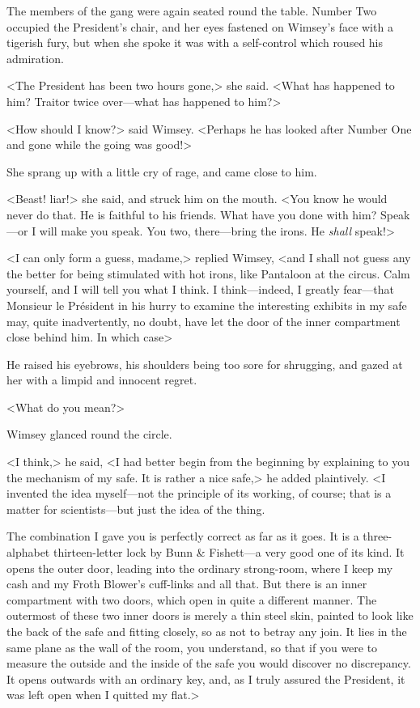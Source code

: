 The members of the gang were again seated round the table. Number Two occupied the President's chair, and her eyes fastened on Wimsey's face with a tigerish fury, but when she spoke it was with a self-control which roused his admiration.

<The President has been two hours gone,> she said. <What has happened to him? Traitor twice over—what has happened to him?>

<How should I know?> said Wimsey. <Perhaps he has looked after Number One and gone while the going was good!>

She sprang up with a little cry of rage, and came close to him.

<Beast! liar!> she said, and struck him on the mouth. <You know he would never do that. He is faithful to his friends. What have you done with him? Speak—or I will make you speak. You two, there—bring the irons. He \textit{shall} speak!>

<I can only form a guess, madame,> replied Wimsey, <and I shall not guess any the better for being stimulated with hot irons, like Pantaloon at the circus. Calm yourself, and I will tell you what I think. I think—indeed, I greatly fear—that Monsieur le Président in his hurry to examine the interesting exhibits in my safe may, quite inadvertently, no doubt, have let the door of the inner compartment close behind him. In which case\longdash>

He raised his eyebrows, his shoulders being too sore for shrugging, and gazed at her with a limpid and innocent regret.

<What do you mean?>

Wimsey glanced round the circle.

<I think,> he said, <I had better begin from the beginning by explaining to you the mechanism of my safe. It is rather a nice safe,> he added plaintively. <I invented the idea myself—not the principle of its working, of course; that is a matter for scientists—but just the idea of the thing.

The combination I gave you is perfectly correct as far as it goes. It is a three-alphabet thirteen-letter lock by Bunn \& Fishett—a very good one of its kind. It opens the outer door, leading into the ordinary strong-room, where I keep my cash and my Froth Blower's cuff-links and all that. But there is an inner compartment with two doors, which open in quite a different manner. The outermost of these two inner doors is merely a thin steel skin, painted to look like the back of the safe and fitting closely, so as not to betray any join. It lies in the same plane as the wall of the room, you understand, so that if you were to measure the outside and the inside of the safe you would discover no discrepancy. It opens outwards with an ordinary key, and, as I truly assured the President, it was left open when I quitted my flat.>

